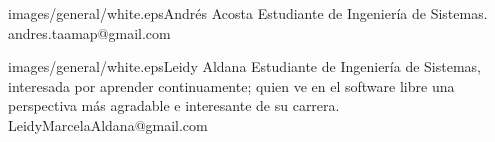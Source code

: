 \begin{multicols}{2}
\begin{biografia}{images/general/white.eps}{Andrés Acosta} 
Estudiante de Ingeniería de Sistemas.\\andres.taamap@gmail.com
\end{biografia}

\begin{biografia}{images/general/white.eps}{Leidy Aldana} 
Estudiante de Ingeniería de Sistemas, interesada por aprender continuamente; quien ve en el software libre una perspectiva más agradable e interesante de su carrera.\\LeidyMarcelaAldana@gmail.com

\end{biografia}

\raggedcolumns
\pagebreak

\end{multicols}

\clearpage
\pagebreak
